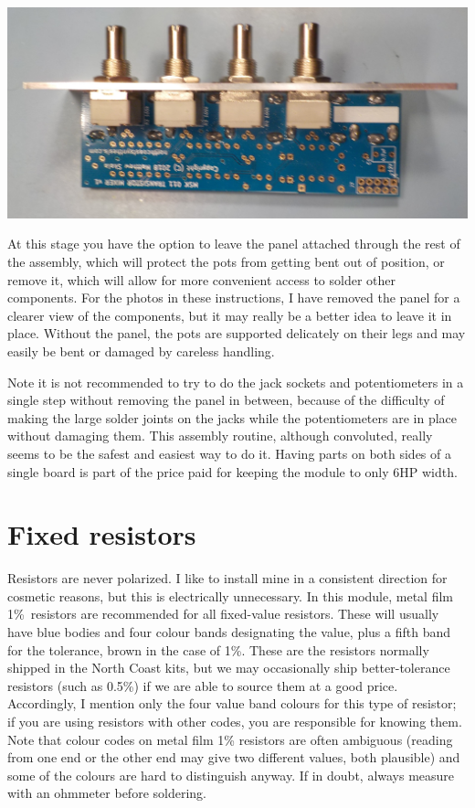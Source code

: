 \noindent\includegraphics[width=\linewidth]{pots-panel.jpg}

At this stage you have the option to leave the panel attached through the
rest of the assembly, which will protect the pots from getting bent out of
position, or remove it, which will allow for more convenient access to
solder other components.  For the photos in these instructions, I have
removed the panel for a clearer view of the components, but it may really be
a better idea to leave it in place.  Without the panel, the pots are
supported delicately on their legs and may easily be bent or damaged by
careless handling.

Note it is not recommended to try to do the jack sockets and potentiometers
in a single step without removing the panel in between, because of the
difficulty of making the large solder joints on the jacks while the
potentiometers are in place without damaging them.  This assembly routine,
although convoluted, really seems to be the safest and easiest way to do it. 
Having parts on both sides of a single board is part of the price paid for
keeping the module to only 6HP width.

\section{Fixed resistors}

Resistors are never polarized.  I like to install mine in a consistent
direction for cosmetic reasons, but this is electrically unnecessary.  In
this module, metal film 1\%\ resistors are recommended for all fixed-value
resistors.  These will usually have blue bodies and four colour bands
designating the value, plus a fifth band for the tolerance, brown in the
case of 1\%.  These are the resistors normally shipped in the
North Coast kits, but we may occasionally ship better-tolerance resistors (such
as 0.5\%) if we are able to source them at a good price. 
Accordingly, I mention only the four value band colours for this type of
resistor; if you are using resistors with other codes, you are responsible
for knowing them.  Note that colour codes on metal film 1\% resistors are
often ambiguous (reading from one end or the other end may give two
different values, both plausible) and some of the colours are hard to
distinguish anyway.  If in doubt, always measure with an ohmmeter before
soldering.

